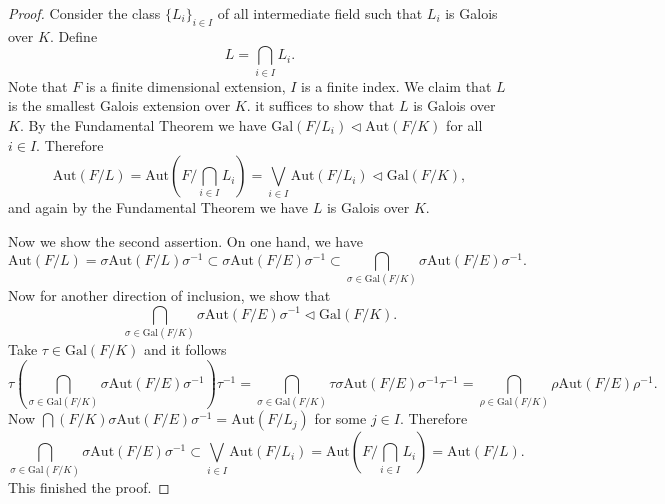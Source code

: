 \begin{proof}
Consider the class $\{L_i\}_{i\in I}$ of all intermediate field such that $L_i$ is Galois over $K$. Define 
$$
L=\bigcap_{i\in I}{L_i}.
$$
Note that $F$ is a finite dimensional extension, $I$ is a finite index. We claim that $L$ is the smallest Galois extension over $K$. it suffices to show that $L$ is Galois over $K$. By the Fundamental Theorem we have $\mathrm{Gal}\left( F/L_i \right) \lhd \mathrm{Aut}\left( F/K \right) $ for all $i\in I$. Therefore 
$$
\mathrm{Aut}\left( F/L \right) =\mathrm{Aut}\left( F/\bigcap_{i\in I}{L_i} \right) =\bigvee_{i\in I}{\mathrm{Aut}\left( F/L_i \right)}\lhd \mathrm{Gal}\left( F/K \right) ,
$$
and again by the Fundamental Theorem we have $L$ is Galois over $K$.\par
Now we show the second assertion. On one hand, we have 
$$
\mathrm{Aut}\left( F/L \right) =\sigma \mathrm{Aut}\left( F/L \right) \sigma ^{-1}\subset \sigma \mathrm{Aut}\left( F/E \right) \sigma ^{-1}\subset \bigcap_{\sigma \in \mathrm{Gal}\left( F/K \right)}{\sigma \mathrm{Aut}\left( F/E \right) \sigma ^{-1}}.
$$
Now for another direction of inclusion, we show that 
$$
\bigcap_{\sigma \in \mathrm{Gal}\left( F/K \right)}{\sigma \mathrm{Aut}\left( F/E \right) \sigma ^{-1}}\lhd \mathrm{Gal}\left( F/K \right) .
$$
Take $\tau\in\mathrm{Gal}(F/K)$ and it follows 
$$
\tau \left( \bigcap_{\sigma \in \mathrm{Gal}\left( F/K \right)}{\sigma \mathrm{Aut}\left( F/E \right) \sigma ^{-1}} \right) \tau ^{-1}=\bigcap_{\sigma \in \mathrm{Gal}\left( F/K \right)}{\tau \sigma \mathrm{Aut}\left( F/E \right) \sigma ^{-1}\tau ^{-1}}=\bigcap_{\rho \in \mathrm{Gal}\left( F/K \right)}{\rho \mathrm{Aut}\left( F/E \right) \rho ^{-1}}.
$$
Now $\bigcap\left( F/K \right){\sigma \mathrm{Aut}\left( F/E \right) \sigma ^{-1}}=\mathrm{Aut}(F/L_j)$ for some $j\in I$. Therefore 
$$
\bigcap_{\sigma \in \mathrm{Gal}\left( F/K \right)}{\sigma \mathrm{Aut}\left( F/E \right) \sigma ^{-1}}\subset \bigvee_{i\in I}{\mathrm{Aut}\left( F/L_i \right)}=\mathrm{Aut}\left( F/\bigcap_{i\in I}{L_i} \right) =\mathrm{Aut}\left( F/L \right) .
$$
This finished the proof.
\end{proof}

